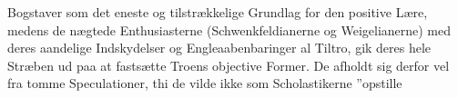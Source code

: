 \documentclass[12pt]{book}
\newcommand{\opage}[1]{\marginnote{\footnotesize\textit{[#1]}}}
\begin{document}
\opage{81} Bogstaver som det eneste og tilstrækkelige Grundlag for den positive Lære,
medens de nægtede Enthusiasterne (Schwenkfeldianerne og Weigelianerne) med
deres aandelige Indskydelser og Engleaabenbaringer al Tiltro, gik deres hele
Stræben ud paa at fastsætte Troens objective Former. De afholdt sig derfor
vel fra tomme Speculationer, thi de vilde ikke som Scholastikerne ”opstille
\end{document}
